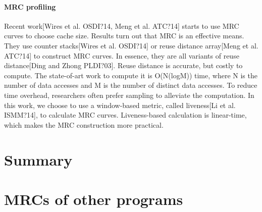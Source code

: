 \documentclass[preprint,nocopyrightspace,10pt]{sigplanconf}
\begin{document}
\paragraph{MRC profiling}
Recent work[Wires et al. OSDI?14, Meng et al. ATC?14] starts to use
MRC curves to choose cache size. Results turn out that MRC is an effective
means. They use counter stacks[Wires et al. OSDI?14] or reuse distance
array[Meng et al. ATC?14] to construct MRC curves. In essence, they are
all variants of reuse distance[Ding and Zhong PLDI?03]. Reuse distance is
accurate, but costly to compute. The state-of-art work to compute it is
O(N(logM)) time, where N is the number of data accesses and M is the
number of distinct data accesses. To reduce time overhead, researchers often
prefer sampling to alleviate the computation.
In this work, we choose to use a window-based metric, called liveness[Li
et al. ISMM?14], to calculate MRC curves. Liveness-based calculation is
linear-time, which makes the MRC construction more practical.

\section{Summary}

%

%


\appendix

\section{MRCs of other programs}
\end{document}
